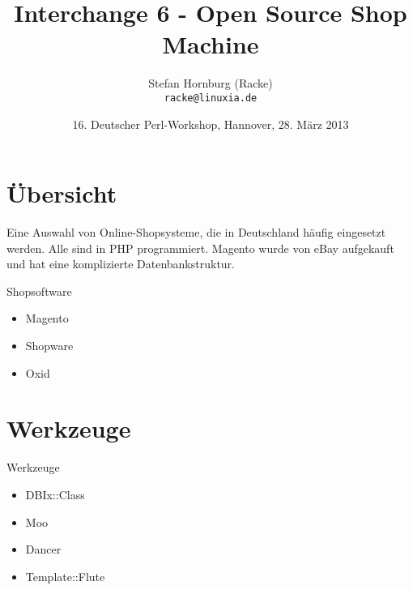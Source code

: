 \usepackage[utf8]{inputenc}
\usepackage[T1]{fontenc}
\usepackage{mathptmx}
\usepackage[scaled=.90]{helvet}
\usepackage{courier}
\usepackage{caption}
\captionsetup{labelformat=empty,labelsep=none}
\usepackage{verbatim}
\usepackage{hyperref}
\usepackage{listings}
\lstset{language=Perl,basicstyle=\normalsize,tabsize=3,showstringspaces=false}

\title{Interchange 6 - Open Source Shop Machine}
\author[racke]{Stefan Hornburg (Racke)\\ \texttt{racke@linuxia.de}}
\date{16. Deutscher Perl-Workshop, Hannover, 28. März 2013}


\maketitle{}

\begin{frame}
  \titlepage
\end{frame}

\tableofcontents

\section{Übersicht}

Eine Auswahl von Online-Shopsysteme, die in Deutschland häufig eingesetzt
werden. Alle sind in PHP programmiert. Magento wurde von eBay aufgekauft
und hat eine komplizierte Datenbankstruktur.
 
\begin{frame}{Shopsoftware}
  \begin{itemize}
  \item Magento
  \item Shopware
  \item Oxid
  \end{itemize}
\end{frame}

\section{Werkzeuge}
\begin{frame}{Werkzeuge}
  \begin{itemize}
  \item DBIx::Class
  \item Moo
  \item Dancer
  \item Template::Flute
  \end{itemize}
\end{frame}

